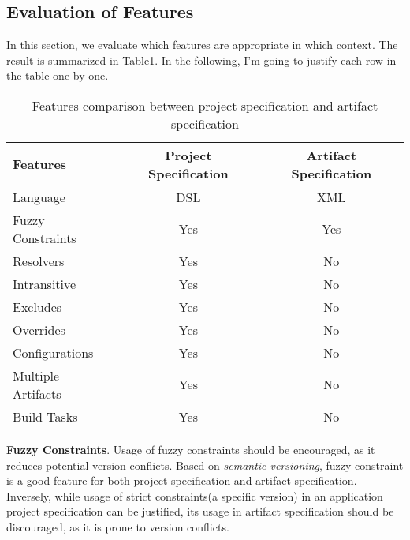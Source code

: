 \subsection{Evaluation of Features}

In this section, we evaluate which features are appropriate in which context. The result is summarized in Table\ref{table:prag:features}. In the following, I'm going to justify each row in the table one by one.

\begin{table}
  \center
  \begin{tabular}{|l|c|c|}
    \hline
    Features              & Project Specification & Artifact Specification \\
    \hline
    Language              &   DSL                 & XML \\
    Fuzzy Constraints     &   Yes                 & Yes \\
    Resolvers             &   Yes                 & No \\
    Intransitive          &   Yes                 & No \\
    Excludes              &   Yes                 & No \\
    Overrides             &   Yes                 & No \\
    Configurations        &   Yes                 & No \\
    Multiple Artifacts    &   Yes                 & No \\
    Build Tasks           &   Yes                 & No \\
    \hline
  \end{tabular}
  \caption[Features Comparison]{Features comparison between project specification and artifact specification \label{table:prag:features}}
\end{table}

\textbf{Fuzzy Constraints}. Usage of fuzzy constraints should be encouraged, as it reduces potential version conflicts. Based on \emph{semantic versioning}, fuzzy constraint is a good feature for both project specification and artifact specification. Inversely, while usage of strict constraints(a specific version) in an application project specification can be justified, its usage in artifact specification should be discouraged, as it is prone to version conflicts.


